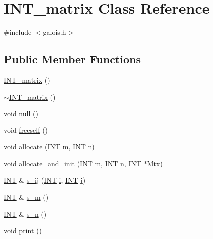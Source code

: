 \hypertarget{class_i_n_t__matrix}{}\section{I\+N\+T\+\_\+matrix Class Reference}
\label{class_i_n_t__matrix}


{\ttfamily \#include $<$galois.\+h$>$}

\subsection*{Public Member Functions}
\begin{DoxyCompactItemize}
\item 
\mbox{\hyperlink{class_i_n_t__matrix_af9f33540ce53964e21c63f272612ec6f}{I\+N\+T\+\_\+matrix}} ()
\item 
\mbox{\hyperlink{class_i_n_t__matrix_a6896ec5fe1bbb5a13fd71d35bad8cdea}{$\sim$\+I\+N\+T\+\_\+matrix}} ()
\item 
void \mbox{\hyperlink{class_i_n_t__matrix_a516efd12df2b5b15a4af3b85d409c4bc}{null}} ()
\item 
void \mbox{\hyperlink{class_i_n_t__matrix_a7d7429023e6a92987b66c3450ef38944}{freeself}} ()
\item 
void \mbox{\hyperlink{class_i_n_t__matrix_aefd72cf83a84c14335eca38fc854c73f}{allocate}} (\mbox{\hyperlink{galois_8h_a09fddde158a3a20bd2dcadb609de11dc}{I\+NT}} \mbox{\hyperlink{class_i_n_t__matrix_a15b2c0e2ff35acea0ee975e3c1044c5f}{m}}, \mbox{\hyperlink{galois_8h_a09fddde158a3a20bd2dcadb609de11dc}{I\+NT}} \mbox{\hyperlink{class_i_n_t__matrix_a23dc7a503832dd0fa661d3e42f378742}{n}})
\item 
void \mbox{\hyperlink{class_i_n_t__matrix_ab0da3cef27c4ce8c4e30a71d9bb977de}{allocate\+\_\+and\+\_\+init}} (\mbox{\hyperlink{galois_8h_a09fddde158a3a20bd2dcadb609de11dc}{I\+NT}} \mbox{\hyperlink{class_i_n_t__matrix_a15b2c0e2ff35acea0ee975e3c1044c5f}{m}}, \mbox{\hyperlink{galois_8h_a09fddde158a3a20bd2dcadb609de11dc}{I\+NT}} \mbox{\hyperlink{class_i_n_t__matrix_a23dc7a503832dd0fa661d3e42f378742}{n}}, \mbox{\hyperlink{galois_8h_a09fddde158a3a20bd2dcadb609de11dc}{I\+NT}} $\ast$Mtx)
\item 
\mbox{\hyperlink{galois_8h_a09fddde158a3a20bd2dcadb609de11dc}{I\+NT}} \& \mbox{\hyperlink{class_i_n_t__matrix_a495bf91b533aa26fd82c276b8c38aec7}{s\+\_\+ij}} (\mbox{\hyperlink{galois_8h_a09fddde158a3a20bd2dcadb609de11dc}{I\+NT}} \mbox{\hyperlink{alphabet2_8_c_acb559820d9ca11295b4500f179ef6392}{i}}, \mbox{\hyperlink{galois_8h_a09fddde158a3a20bd2dcadb609de11dc}{I\+NT}} \mbox{\hyperlink{alphabet2_8_c_a37d972ae0b47b9099e30983131d31916}{j}})
\item 
\mbox{\hyperlink{galois_8h_a09fddde158a3a20bd2dcadb609de11dc}{I\+NT}} \& \mbox{\hyperlink{class_i_n_t__matrix_a973ad2dc199432b050a81eda1d75c986}{s\+\_\+m}} ()
\item 
\mbox{\hyperlink{galois_8h_a09fddde158a3a20bd2dcadb609de11dc}{I\+NT}} \& \mbox{\hyperlink{class_i_n_t__matrix_a013698dd4d01e810a83adef8bb92df03}{s\+\_\+n}} ()
\item 
void \mbox{\hyperlink{class_i_n_t__matrix_a02695ab85f9330a2bc730796d88fb672}{print}} ()
\end{DoxyCompactItemize}
